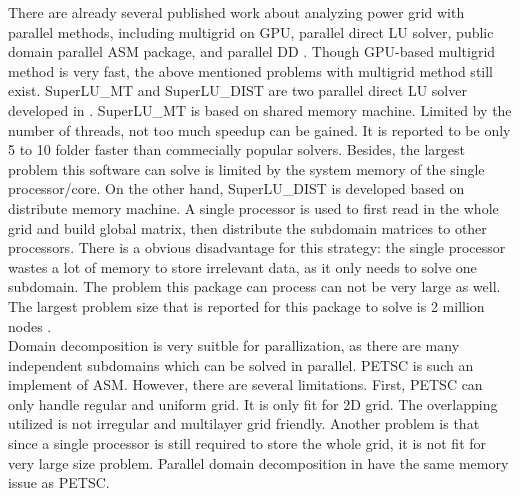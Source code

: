 \documentclass{sig-alternate}
\begin{document}
	There are already several published work about analyzing power grid with parallel methods, including multigrid on GPU\cite{Zhuofeng}, parallel direct LU 
	solver\cite{Super_LU_website}, public domain parallel ASM package\cite{PETSC_website}, and parallel DD
	\cite{kaisun, voronov}. Though GPU-based multigrid method\cite{Zhuofeng} is very fast, the above mentioned problems with 
	multigrid method 
	still exist. SuperLU\_MT and SuperLU\_DIST are two parallel direct LU solver developed in \cite{Super_LU_website}. SuperLU\_MT is 
	based on shared memory machine. Limited by the number of threads, not too much speedup can be gained. 
	It is reported to be only 5 to 10 folder faster than commecially popular solvers\cite{Super_LU_website}. Besides, the largest 
	problem this software can solve is limited by the system memory of the single processor/core. On the other hand, SuperLU\_DIST 
	is developed based on distribute memory machine. A single processor is used to first read in the whole grid and build global 
	matrix, then distribute the subdomain matrices to other processors. 
	There is a obvious disadvantage for this strategy: the single processor wastes a lot of memory to store irrelevant data, as 
	it only needs to solve one subdomain. The problem this package can 
	process can not be very large as well. The largest problem size that is reported for this package to solve is 2 million nodes
	\cite{Super_LU_website}.\\

	Domain decomposition is very suitble for parallization, as there are many independent subdomains which can be
	solved in parallel. PETSC\cite{PETSC_website} is such an implement of ASM.
	However, there are several limitations. First, PETSC can only handle regular and uniform grid. It is only fit for 2D grid. 
	The overlapping utilized is not irregular and multilayer grid friendly. Another problem is that since a single processor is 
	still required to
	store the whole grid, it is not fit for very large size problem. Parallel domain decomposition in \cite{kaisun, voronov} have
	the same memory issue as PETSC.\\
\end{document}
